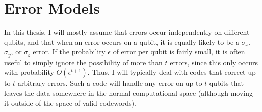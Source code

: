 \documentclass{report}
\newcommand{\X}{\sigma_x}
\newcommand{\Z}{\sigma_z}
\newcommand{\Y}{\sigma_y}
\begin{document}
\section{Error Models}

In this thesis, I will mostly assume that errors occur independently on 
different qubits, and that when an error occurs on a qubit, it is equally 
likely to be a $\X$, $\Y$, or $\Z$ error.  If the probability $\epsilon$ of 
error per qubit is fairly small, it is often useful to simply ignore the 
possibility of more than $t$ errors, since this only occurs with probability 
$O(\epsilon^{t+1})$.  Thus, I will typically deal with codes that correct up 
to $t$ arbitrary errors.  Such a code will handle any error on up to $t$ qubits 
that leaves the data somewhere in the normal computational space (although 
moving it outside of the space of valid codewords).
\end{document}
